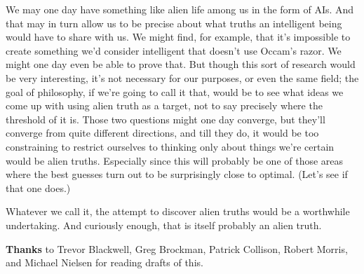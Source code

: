 We may one day have something like alien life among us in the form of
AIs. And that may in turn allow us to be precise about what truths an
intelligent being would have to share with us. We might find, for
example, that it's impossible to create something we'd consider
intelligent that doesn't use Occam's razor. We might one day even be
able to prove that. But though this sort of research would be very
interesting, it's not necessary for our purposes, or even the same
field; the goal of philosophy, if we're going to call it that, would be
to see what ideas we come up with using alien truth as a target, not to
say precisely where the threshold of it is. Those two questions might
one day converge, but they'll converge from quite different directions,
and till they do, it would be too constraining to restrict ourselves to
thinking only about things we're certain would be alien truths.
Especially since this will probably be one of those areas where the best
guesses turn out to be surprisingly close to optimal. (Let's see if that
one does.)

Whatever we call it, the attempt to discover alien truths would be a
worthwhile undertaking. And curiously enough, that is itself probably an
alien truth.

\textbf{Thanks} to Trevor Blackwell, Greg Brockman, Patrick Collison,
Robert Morris, and Michael Nielsen for reading drafts of this.